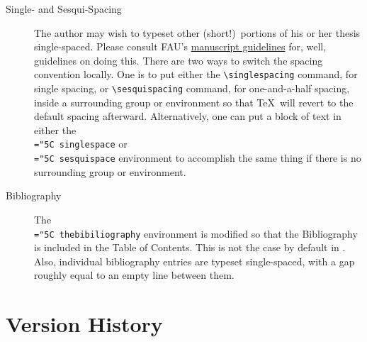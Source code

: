 \documentclass[11pt]{article}
\newcommand\guide{{http://www.fau.edu/graduate/forms-and-procedures/degree-completion/thesis-and-dissertation/index.php}}
\newcommand\code[1]{{\normalfont\texttt{\let\dv\textsl\chardef\\="5C #1}}}
\begin{document}
\begin{description}
\item[Single- and Sesqui-Spacing]
The author may wish to typeset other (short!)\ portions of his or her thesis single-spaced.  Please consult FAU's 
\href\guide{manuscript guidelines} 
for, well, guidelines on doing this.  There are two ways to switch the spacing convention locally.  One is to put either the \verb=\singlespacing= command, for single spacing, or \verb=\sesquispacing= command, for one-and-a-half spacing, inside a surrounding group or environment so that \TeX\ will revert to the default spacing afterward.  Alternatively, one can put a block of text in either the \code{singlespace} or \code{sesquispace} environment to accomplish the same thing if there is no surrounding group or environment.

\item[Bibliography]
The \code{thebibiliography} environment is modified so that the Bibliography is included in the Table of Contents.  This is not the case by default in \LaTeXe.  Also, individual bibliography entries are typeset single-spaced, with a gap roughly equal to an empty line between them.

\end{description}



\appendix



\section{Version History}
\end{document}
